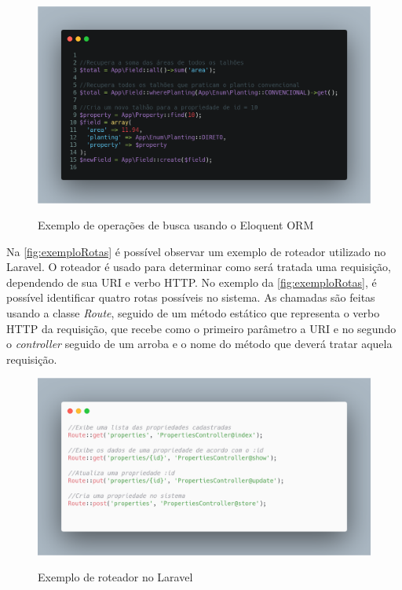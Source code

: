 \begin{figure}[H]
    \centering
    \caption{Exemplo de operações de busca usando o Eloquent ORM}
    \includegraphics[width=13cm]{dados/figuras/exemplo_Model_Eloquent.png}
    \label{fig:modelEloquent}
\end{figure}

Na \autoref{fig:exemploRotas} é possível observar um exemplo de roteador utilizado no Laravel. O roteador é usado para determinar como será tratada uma requisição, dependendo de sua URI e verbo HTTP. No exemplo da \autoref{fig:exemploRotas}, é possível identificar quatro rotas possíveis no sistema. As chamadas são feitas usando a classe \textit{Route}, seguido de um método estático que representa o verbo HTTP da requisição, que recebe como o primeiro parâmetro a URI e no segundo o \textit{controller} seguido de um arroba e o nome do método que deverá tratar aquela requisição.

\begin{figure}[H]
    \centering
    \caption{Exemplo de roteador no Laravel}
    \includegraphics[width=13cm]{dados/figuras/exemplo_Rotas_Laravel.png}
    \label{fig:exemploRotas}
\end{figure}


